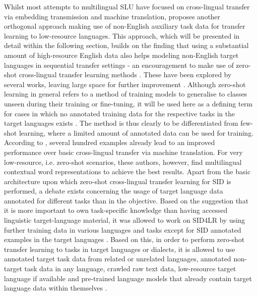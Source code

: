 \documentclass[11pt,a4paper,twoside,openright]{scrbook}
\begin{document}
Whilst most attempts to multilingual SLU have focused on cross-lingual transfer via embedding transmission and machine translation, \citet{van-der-goot-etal-2021-masked} proposes another orthogonal approach making use of non-English auxiliary task data for transfer learning to low-resource languages. This approach, which will be presented in detail within the following section, builds on the finding that using a substantial amount of high-resource English data also helps modeling non-English target languages in sequential transfer settings - an encouragement to make use of zero-shot cross-lingual transfer learning methods \citep{phang-etal-2020-english}. These have been explored by several works, leaving large space for further improvement \citep{louvan-magnini-2020-recent, qin2020cosdamlmultilingual, liu2019attention, liu-etal-2019-zero}. Although zero-shot learning in general refers to a method of training models to generalise to classes unseen during their training or fine-tuning, it will be used here as a defining term for cases in which no annotated training data for the respective tasks in the target languages exists \citep{schuster-etal-2019-cross-lingual}. The method is thus clearly to be differentiated from few-shot learning, where a limited amount of annotated data can be used for training. According to \citet{schuster-etal-2019-cross-lingual}, several hundred examples already lead to an improved performance over basic cross-lingual transfer via machine translation. For very low-resource, i.e. zero-shot scenarios, these authors, however, find multilingual contextual word representations to achieve the best results.
Apart from the basic architecture upon which zero-shot cross-lingual transfer learning for SID is performed, a debate exists concerning the usage of target language data annotated for different tasks than in the objective. Based on the suggestion that it is more important to own task-specific knowledge than having accessed linguistic target-language material, it was allowed to work on SID4LR by using further training data in various languages and tasks except for SID annotated examples in the target languages \citep{2023-findings-vardial}. Based on this, in order to perform zero-shot transfer learning to tasks in target languages or dialects, it is allowed to use annotated target task data from related or unrelated languages, annotated non-target task data in any language, crawled raw text data, low-resource target language if available and pre-trained language models that already contain target language data within themselves \citep{2023-findings-vardial}.
\end{document}
